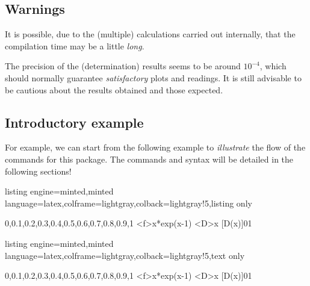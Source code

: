 \documentclass[11pt,a4paper]{ltxdoc}
\begin{document}
\subsection{Warnings}

It is possible, due to the (multiple) calculations carried out internally, that the compilation time may be a little \textit{long}.

\smallskip

The precision of the (determination) results seems to be around $10^{-4}$, which should normally guarantee \textit{satisfactory} plots and readings. It is still advisable to be cautious about the results obtained and those expected.

\subsection{Introductory example}

For example, we can start from the following example to \textit{illustrate} the flow of the commands for this package. The commands and syntax will be detailed in the following sections!

\begin{tcblisting}{listing engine=minted,minted language=latex,colframe=lightgray,colback=lightgray!5,listing only}
\begin{GraphTikz}%
	[x=7.5cm,y=7.5cm,Xmin=0,Xmax=1.001,Xgrid=0.1,Xgrids=0.02,
	Ymin=0,Ymax=1.001,Ygrid=0.1,Ygrids=0.02]
		{0,0.1,0.2,0.3,0.4,0.5,0.6,0.7,0.8,0.9,1}
	{x*exp(x-1)}
	{x}
	[D(x)]{0}{1}
\end{GraphTikz}
\end{tcblisting}

\begin{tcblisting}{listing engine=minted,minted language=latex,colframe=lightgray,colback=lightgray!5,text only}
	\begin{GraphTikz}%
		[x=7.5cm,y=7.5cm,Xmin=0,Xmax=1.001,Xgrid=0.1,Xgrids=0.02,
		Ymin=0,Ymax=1.001,Ygrid=0.1,Ygrids=0.02]
		{0,0.1,0.2,0.3,0.4,0.5,0.6,0.7,0.8,0.9,1}
		\DefineCurve[Name=cf,Start=0,End=1]<f>{x*exp(x-1)}
		\DefineCurve[Name=delta,Start=0,End=1]<D>{x}
		{0}{1}
	\end{GraphTikz}
\end{tcblisting}
\end{document}
